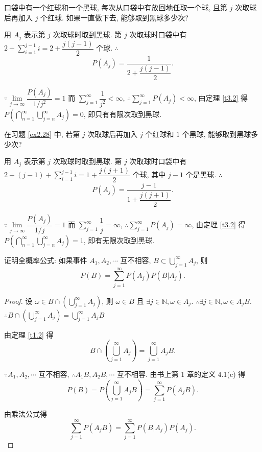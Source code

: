 \documentclass[color=black,device=normal,lang=cn]{elegantnote}
\numberwithin{equation}{section}
\theoremstyle{plain}
\numberwithin{exercise}{exsection}
\begin{document}
\addtocounter{exercise}{7}
\begin{exercise}\label{ex2.28}
    口袋中有一个红球和一个黑球, 每次从口袋中有放回地任取一个球, 且第 $j$ 次取球后再加入 $j$ 个红球. 如果一直做下去, 能够取到黑球多少次?
\end{exercise}
\begin{solution}
    用 $A_j$ 表示第 $j$ 次取球时取到黑球. 第 $j$ 次取球时口袋中有 $2+\sum\limits_{i=1}^{j-1}i=2+\dfrac{j(j-1)}{2}$ 个球. $\therefore$
    \[P(A_j)=\dfrac{1}{2+\dfrac{j(j-1)}{2}}.\]

    $\because\lim\limits_{j\to\infty}\dfrac{P(A_j)}{1/j^2}=1$ 而 $\sum\limits_{j=1}^\infty\dfrac{1}{j^2}<\infty$, $\therefore\sum\limits_{j=1}^\infty P(A_j)<\infty$, 由定理 \ref{t3.2} 得 $P\left(\bigcap\limits_{n=1}^\infty\bigcup\limits_{j=n}^\infty A_j\right)=0$, 即只有有限次取到黑球.
\end{solution}
\begin{exercise}%
    在习题 \ref{ex2.28} 中, 若第 $j$ 次取球后再加入 $j$ 个红球和 $1$ 个黑球, 能够取到黑球多少次?
\end{exercise}
\begin{solution}
    用 $A_j$ 表示第 $j$ 次取球时取到黑球. 第 $j$ 次取球时口袋中有 $2+(j-1)+\sum\limits_{i=1}^{j-1}i=1+\dfrac{j(j+1)}{2}$ 个球, 其中 $j-1$ 个是黑球. $\therefore$
    \[P(A_j)=\dfrac{j-1}{1+\dfrac{j(j+1)}{2}}.\]

    $\because\lim\limits_{j\to\infty}\dfrac{P(A_j)}{1/j}=1$ 而 $\sum\limits_{j=1}^\infty\dfrac{1}{j}=\infty$, $\therefore\sum\limits_{j=1}^\infty P(A_j)=\infty$, 由定理 \ref{t3.2} 得 $P\left(\bigcap\limits_{n=1}^\infty\bigcup\limits_{j=n}^\infty A_j\right)=1$, 即有无限次取到黑球.
\end{solution}
\begin{exercise}\label{ex2.30}
    证明全概率公式: 如果事件 $A_1,A_2,\cdots$ 互不相容, $B\subset\bigcup\limits_{j=1}^\infty A_j$, 则
    \[P(B)=\sum\limits_{j=1}^\infty P(A_j)P(B|A_j).\]
\end{exercise}
\begin{proof}
    设 $\omega\in B\cap\left(\bigcup\limits_{j=1}^\infty A_j\right)$, 则 $\omega\in B$ 且 $\exists j\in\mathbb{N},\omega\in A_j$. $\therefore\exists j\in\mathbb{N},\omega\in A_jB$. $\therefore B\cap\left(\bigcup\limits_{j=1}^\infty A_j\right)=\bigcup\limits_{j=1}^\infty A_jB$

    由定理 \ref{t1.2} 得
    \[B\cap\left(\bigcup\limits_{j=1}^\infty A_j\right)=\bigcup\limits_{j=1}^\infty A_jB.\]

    $\because A_1,A_2,\cdots$ 互不相容, $\therefore A_1B,A_2B,\cdots$ 互不相容. 由书上第 1 章的定义 4.1(c) 得
    \[P(B)=P\left(\bigcup\limits_{j=1}^\infty A_jB\right)=\sum\limits_{j=1}^\infty P(A_jB).\]

    由乘法公式得
    \[\sum\limits_{j=1}^\infty P(A_jB)=\sum\limits_{j=1}^\infty P(B|A_j)P(A_j).\]
\end{proof}
\end{document}
